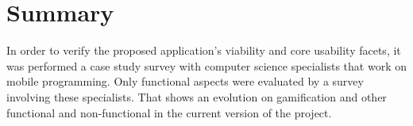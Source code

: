 {%
%
%
%
%
}
\section{Summary}

In order to verify the proposed application's viability and core usability facets, it was performed a case study survey with computer science specialists that work on mobile programming. Only functional aspects were evaluated by a survey involving these specialists. That shows an evolution on gamification and other functional and non-functional in the current version of the project.